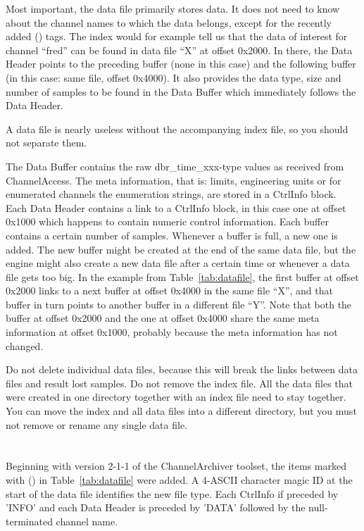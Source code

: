 Most important, the data file primarily stores data. It does not need
to know about the channel names to which the data belongs, except for
the recently added (\dag) tags. The index would for example tell us
that the data of interest for channel ``fred'' can be found in data
file ``X'' at offset 0x2000. In there, the Data Header points to the
preceding buffer (none in this case) and the following buffer (in this
case: same file, offset 0x4000). It also provides the data type, size
and number of samples to be found in the Data Buffer
which immediately follows the Data Header.

 A data file is nearly useless without the
accompanying index file, so you should not separate them.

\noindent The Data Buffer contains the raw dbr\_time\_xxx-type values
as received from ChannelAccess. The meta information, that is: limits,
engineering units or for enumerated channels the enumeration strings,
are stored in a CtrlInfo block. Each Data Header contains a link to a
CtrlInfo block, in this case one at offset 0x1000 which happens to
contain numeric control information.
Each buffer contains a certain number of samples. Whenever a buffer is
full, a new one is added. The new buffer might be created at the end
of the same data file, but the engine might also create a new data
file after a certain time or whenever a data file gets too big.
In the example from Table~\ref{tab:datafile}, the first buffer at offset
0x2000 links to a next buffer at offset 0x4000 in the same file ``X'',
and that buffer in turn points to another buffer in a different file
``Y''. Note that both the buffer at offset 0x2000 and the one at
offset 0x4000 share the same meta information at offset 0x1000,
probably because the meta information has not changed.

 Do not delete individual data
files, because this will break the links between data files and result
lost samples. Do not remove the index file. All the data files that were
created in one directory together with an index file need to stay together.
You can move the index and all data files into a different directory, but
you must not remove or rename any single data file.

\section{}
Beginning with version 2-1-1 of the ChannelArchiver toolset, the items
marked with (\dag) in Table~\ref{tab:datafile} were added.  A
4-ASCII character magic ID at the start of the data file identifies
the new file type. Each CtrlInfo if preceded by 'INFO' and each Data
Header is preceded by 'DATA' followed by the null-terminated channel
name.

